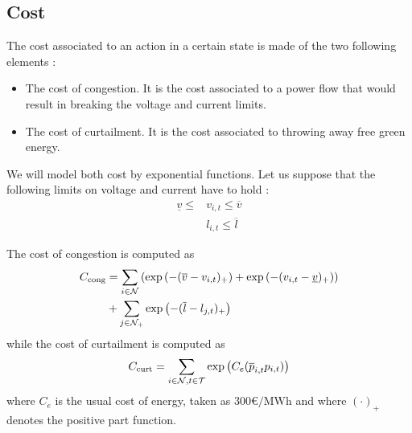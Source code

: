 \subsection{Cost}
The cost associated to an action in a certain state is made of the two following elements :
\begin{itemize}
  \item The cost of congestion. It is the cost associated to a power flow that would result in breaking the voltage and current limits.
  \item The cost of curtailment. It is the cost associated to throwing away free green energy.
\end{itemize}

We will model both cost by exponential functions.
Let us suppose that the following limits on voltage and current have to hold :
\begin{align*}
  \underline{v} \le &v_{i,t} \le \overline{v}\\
  &l_{i,t} \le \overline{l}
\end{align*}

The cost of congestion is computed as
\begin{align*}
  C_{\text{cong}} &= \sum_{i \in \mathcal{N}} \left( \exp{\left(-(\overline{v}-v_{i,t})_+\right)} + \exp{\left(-(v_{i,t}-\underline{v})_+\right)} \right)  \\
  &+ \sum_{j \in \mathcal{N}_+} \exp{\left(-(\overline{l}-l_{j,t})_+\right)}
\end{align*}
while the cost of curtailment is computed as
\[
  C_{\text{curt}} = \sum_{i \in \mathcal{N},t \in \mathcal{T}} \exp{\left(C_e(\overline{p}_{i,t}p_{i,t})\right)}
\]
where $C_e$ is the usual cost of energy, taken as $300\si{\euro\per\mega\watt\hour}$ and where $(\cdot)_+$ denotes the positive part function.
